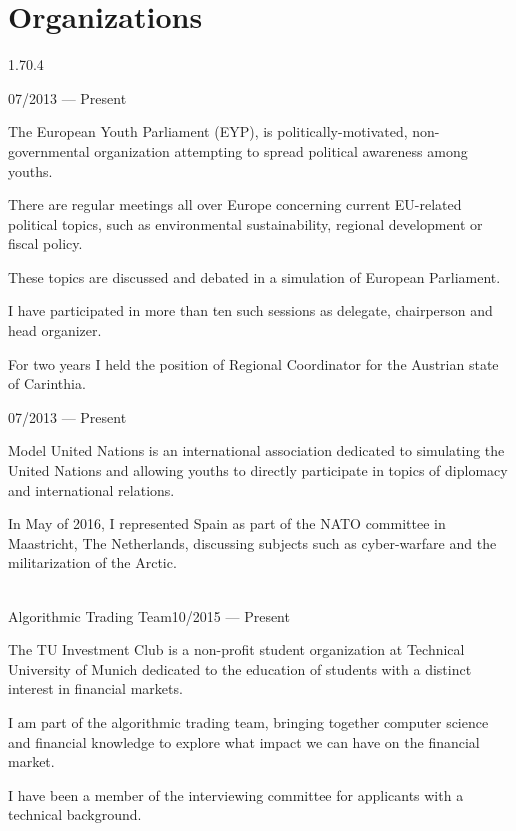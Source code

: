 \section{Organizations}{1.7}{0.4}
\begin{entry}{}{}{07/2013 --- Present}
  \item The European Youth Parliament (EYP), is politically-motivated, non-governmental organization attempting to spread political awareness among youths.
  \item There are regular meetings all over Europe concerning current EU-related political topics, such as environmental sustainability, regional development or fiscal policy.
  \item These topics are discussed and debated in a simulation of European Parliament.
  \item I have participated in more than ten such sessions as delegate, chairperson and head organizer.
  \item For two years I held the position of Regional Coordinator for the Austrian state of Carinthia.
\end{entry}
\begin{entry}{}{}{07/2013 --- Present}
  \item Model United Nations is an international association dedicated to simulating the United Nations and allowing youths to directly participate in topics of diplomacy and international relations.
  \item In May of 2016, I represented Spain as part of the NATO committee in Maastricht, The Netherlands, discussing subjects such as cyber-warfare and the militarization of the Arctic.
\end{entry}
\begin{entry}{}{\\Algorithmic Trading Team}{10/2015 --- Present}
  \item The TU Investment Club is a non-profit student organization at Technical University of Munich dedicated to the education of students with a distinct interest in financial markets.
  \item I am part of the algorithmic trading team, bringing together computer science and financial knowledge to explore what impact we can have on the financial market.
  \item I have been a member of the interviewing committee for applicants with a technical background.
\end{entry}
